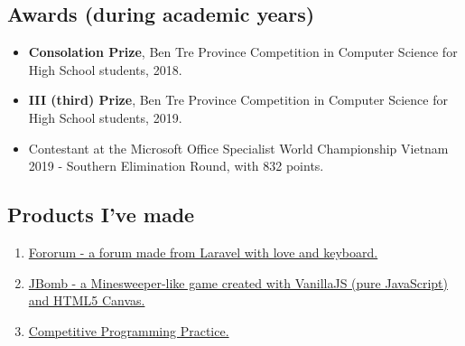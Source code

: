 \documentclass{article}
\begin{document}
		\subsection{Awards (during academic years)}
			\begin{itemize}
				\item {\textbf{Consolation Prize}}, Ben Tre Province Competition in Computer Science for High School students, 2018.
				\item {\textbf{III (third) Prize}}, Ben Tre Province Competition in Computer Science for High School students, 2019.
				\item Contestant at the Microsoft Office Specialist World Championship Vietnam 2019 - Southern Elimination Round, with 832 points.
			\end{itemize}
		\subsection{Products I've made}
			\begin{enumerate}
				\item \href{https://github.com/trhgquan/Fororum}{Fororum - a forum made from Laravel with love and keyboard.}
				\item \href{https://github.com/trhgquan/JBomb}{JBomb - a Minesweeper-like game created with VanillaJS (pure JavaScript) and HTML5 Canvas.}
				\item \href{https://github.com/trhgquan/CPP}{Competitive Programming Practice.}
			\end{enumerate}
\end{document}
